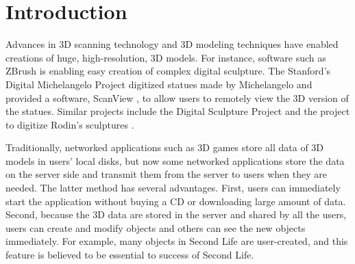 \documentclass[11pt, a4paper]{report}
\begin{document}
\begin{abstract}

\end{abstract}
\chapter{Introduction}
\label{c:intro}
    Advances in 3D scanning technology and 3D modeling
    techniques have enabled creations of huge,
    high-resolution, 3D models.  
    For instance, software such as
    ZBrush is enabling easy creation of complex digital sculpture.
    The Stanford's Digital Michelangelo Project
    \cite{levoy00digital} digitized statues made by Michelangelo
    and provided a software, ScanView \cite{koller04protected},
    to allow users to remotely view the 3D version of the statues.
    Similar projects include the Digital Sculpture Project \cite{deroos2004dsp}
    and the project to digitize Rodin's sculptures \cite{miyazaki2006dab}. 

    Traditionally, networked applications such as 3D games 
    store all data of 3D models in users' local disks, 
    but now some networked applications store the data on the server side 
    and transmit them from the server to users when they are needed. 
    The latter method has several advantages. 
    First, users can immediately start the application without buying a CD
    or downloading large amount of data. 
    Second, because the 3D data are stored in the server and shared by all the users, 
    users can create and modify objects and others can see the new objects immediately. 
    For example, many objects in Second Life are user-created, 
    and this feature is believed to be essential to success of Second Life. 
\end{document}
